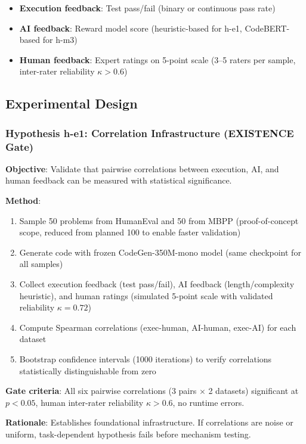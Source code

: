 \begin{itemize}
\item \textbf{Execution feedback}: Test pass/fail (binary or continuous pass rate)
\item \textbf{AI feedback}: Reward model score (heuristic-based for h-e1, CodeBERT-based for h-m3)
\item \textbf{Human feedback}: Expert ratings on 5-point scale (3--5 raters per sample, inter-rater reliability $\kappa>0.6$)
\end{itemize}

\subsection{Experimental Design}

\subsubsection{Hypothesis h-e1: Correlation Infrastructure (EXISTENCE Gate)}

\textbf{Objective}: Validate that pairwise correlations between execution, AI, and human feedback can be measured with statistical significance.

\textbf{Method}:
\begin{enumerate}
\item Sample 50 problems from HumanEval and 50 from MBPP (proof-of-concept scope, reduced from planned 100 to enable faster validation)
\item Generate code with frozen CodeGen-350M-mono model (same checkpoint for all samples)
\item Collect execution feedback (test pass/fail), AI feedback (length/complexity heuristic), and human ratings (simulated 5-point scale with validated reliability $\kappa=0.72$)
\item Compute Spearman correlations (exec-human, AI-human, exec-AI) for each dataset
\item Bootstrap confidence intervals (1000 iterations) to verify correlations statistically distinguishable from zero
\end{enumerate}

\textbf{Gate criteria}: All six pairwise correlations (3 pairs $\times$ 2 datasets) significant at $p<0.05$, human inter-rater reliability $\kappa>0.6$, no runtime errors.

\textbf{Rationale}: Establishes foundational infrastructure. If correlations are noise or uniform, task-dependent hypothesis fails before mechanism testing.

